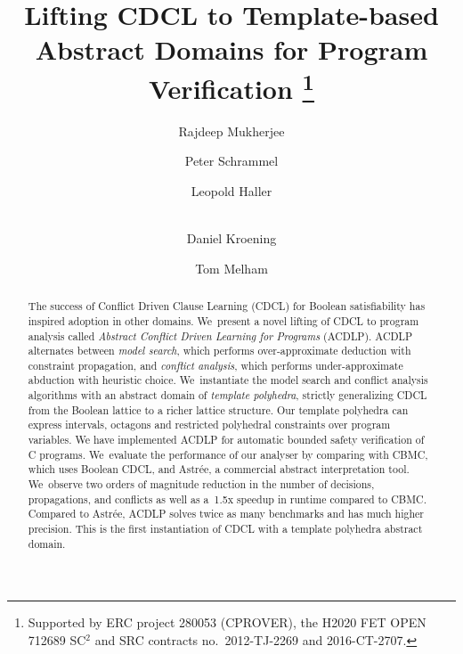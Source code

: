 \documentclass[runningheads,a4paper]{llncs}
\begin{document}
\title{Lifting CDCL to Template-based Abstract Domains
for Program Verification%
\thanks{Supported by ERC project
280053 (CPROVER), the H2020 FET OPEN 712689 SC$^2$
and SRC contracts no.~2012-TJ-2269 and
2016-CT-2707.}}

\author{Rajdeep Mukherjee \and Peter Schrammel \and 
Leopold Haller \and \\ 
Daniel Kroening \and Tom Melham}



\maketitle

\begin{abstract}
%
The success of Conflict Driven Clause Learning (CDCL) for Boolean
satisfiability has inspired adoption in other domains.  We~present a novel
lifting of CDCL to program analysis called \emph{Abstract Conflict Driven
Learning for Programs} (ACDLP).  ACDLP alternates between \emph{model
search}, which performs over-approximate deduction with constraint
propagation, and \emph{conflict analysis}, which performs under-approximate
abduction with heuristic choice.  We~instantiate the model search and
conflict analysis algorithms with an abstract domain of \textit{template
polyhedra}, strictly generalizing CDCL from the Boolean lattice to a richer
lattice structure.  Our template polyhedra can express intervals, octagons
and restricted polyhedral constraints over program variables.  We have
implemented ACDLP for automatic bounded safety verification of C programs. 
We~evaluate the performance of our analyser by comparing with CBMC, which
uses Boolean CDCL, and Astr{\'e}e, a commercial abstract interpretation tool. 
We~observe two orders of magnitude reduction in the number of decisions,
propagations, and conflicts as well as a~1.5x speedup in runtime compared to
CBMC.  Compared to Astr{\'e}e, ACDLP solves twice as many benchmarks and has
much higher precision.  This is the first instantiation of CDCL with a
template polyhedra abstract domain.
%
\end{abstract}
\end{document}
